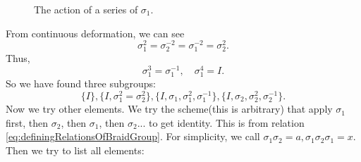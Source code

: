\documentclass{book}
\begin{document}
\begin{figure}[h!]
\label{fig:seriesOfSigma1}
\caption{The action of a series of $\sigma_1$.}
\end{figure}

From continuous deformation, we can see
\begin{equation*}
\sigma _{1}^{2} =\sigma _{2}^{-2} =\sigma _{1}^{-2} =\sigma _{2}^{2} .
\end{equation*}
Thus,
\begin{equation*}
\sigma _{1}^{3} =\sigma _{1}^{-1} ,\quad \sigma _{1}^{4} =I.
\end{equation*}
So we have found three subgroups:
\begin{equation*}
\{I\},\{I,\sigma _{1}^{2} =\sigma _{2}^{2} \},\{I,\sigma _{1} ,\sigma _{1}^{2} ,\sigma _{1}^{-1} \},\{I,\sigma _{2} ,\sigma _{2}^{2} ,\sigma _{2}^{-1} \}.
\end{equation*}
Now we try other elements. We try the scheme(this is arbitrary) that apply $\sigma _{1}$ first, then $\sigma _{2}$, then $\sigma _{1}$, then $\sigma _{2}$... to get identity. This is from relation \eqref{eq:definingRelationsOfBraidGroup}. For simplicity, we call $\sigma _{1} \sigma _{2} =a,\sigma _{1} \sigma _{2} \sigma _{1} =x$. Then we try to list all elements:
\end{document}
